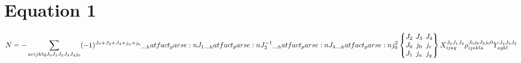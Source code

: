 \documentclass{scrartcl}
\newcommand{\ninej}[9]{\begingroup\setlength{\arraycolsep}{0.2em}\begin{Bmatrix} #1 & #2 & #3 \\ #4 & #5 & #6 \\ #7 & #8 & #9 \end{Bmatrix}\endgroup}
\begin{document}
\section{Equation 1}
\begin{dmath*}
N = -\sum_{a e i j k l q {J}_{0} {J}_{1} {J}_{2} {J}_{3} {J}_{4} {j}_{0}} \* (-1)^{{J}_{0}+{J}_{2}+{J}_{4}+{j}_{a}+{j}_{e}} \* \hatfact{{J}_{1}} \* \hatfact{{J}_{2}^{-1}} \* \hatfact{{J}_{4}} \* \hatfact{{j}_{0}^{2}} \* \ninej{{J}_{2}}{{J}_{3}}{{J}_{4}}{{J}_{0}}{{j}_{0}}{{j}_{e}}{{J}_{1}}{{j}_{a}}{{j}_{q}} \* X_{i j a q}^{{J}_{0} {J}_{1} {J}_{2}} \* \rho_{i j e k l a}^{{J}_{0} {j}_{0} {J}_{3} {j}_{0} 0} \* Y_{e q k l}^{{J}_{4} {J}_{3} {J}_{2}}
\end{dmath*}
\end{document}
